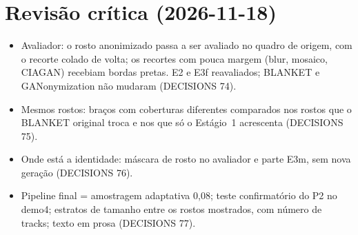 \section{Revisão crítica (2026-11-18)}
\begin{itemize}
\item Avaliador: o rosto anonimizado passa a ser avaliado no quadro de origem, com o recorte colado de volta; os recortes com pouca margem (blur, mosaico, CIAGAN) recebiam bordas pretas. E2 e E3f reavaliados; BLANKET e GANonymization não mudaram (DECISIONS 74).
\item Mesmos rostos: braços com coberturas diferentes comparados nos rostos que o BLANKET original troca e nos que só o Estágio~1 acrescenta (DECISIONS 75).
\item Onde está a identidade: máscara de rosto no avaliador e parte E3m, sem nova geração (DECISIONS 76).
\item Pipeline final = amostragem adaptativa 0,08; teste confirmatório do P2 no demo4; estratos de tamanho entre os rostos mostrados, com número de tracks; texto em prosa (DECISIONS 77).
\end{itemize}

